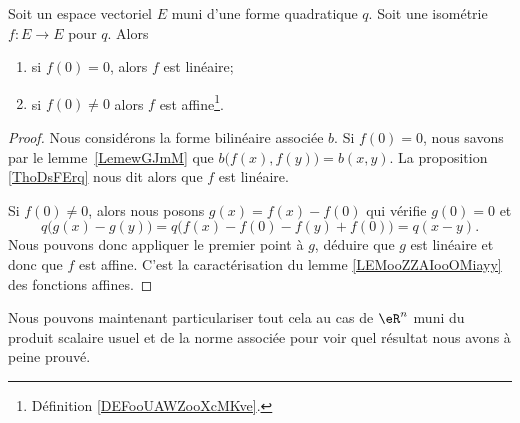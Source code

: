 {}

\begin{theorem}
    Soit un espace vectoriel \( E\) muni d'une forme quadratique \( q\). Soit une isométrie \( f\colon E\to E\) pour \( q\). Alors
    \begin{enumerate}
        \item
            si \( f(0)=0\), alors \( f\) est linéaire;
        \item
            si \( f(0)\neq 0\) alors \( f\) est affine\footnote{Définition \ref{DEFooUAWZooXcMKve}.}.
            
    \end{enumerate}
\end{theorem}

\begin{proof}
    Nous considérons la forme bilinéaire associée \( b\). Si \( f(0)=0\), nous savons par le lemme~\ref{LemewGJmM} que \( b\big( f(x),f(y) \big)=b(x,y)\). La proposition \ref{ThoDsFErq} nous dit alors que \( f\) est linéaire.


    Si \( f(0)\neq 0\), alors nous posons \( g(x)=f(x)-f(0)\) qui vérifie \( g(0)=0\) et
    \begin{equation}
        q\big( g(x)-g(y) \big)=q\big( f(x)-f(0)-f(y)+f(0) \big)=q(x-y).
    \end{equation}
    Nous pouvons donc appliquer le premier point à \( g\), déduire que \( g\) est linéaire et donc que \( f\) est affine. C'est la caractérisation du lemme \ref{LEMooZZAIooOMiayy} des fonctions affines.
\end{proof}

Nous pouvons maintenant particulariser tout cela au cas de \( \eR^n\) muni du produit scalaire usuel et de la norme associée pour voir quel résultat nous avons à peine prouvé.

